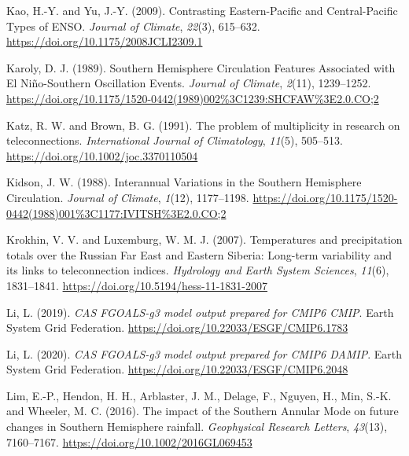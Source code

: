 \documentclass[12pt,oneside,a4paper]{reedthesis}
\newlength{\cslhangindent}
\newenvironment{CSLReferences}[2] %
 {%
  \setlength{\parindent}{0pt}
  \ifodd #1 \everypar{\setlength{\hangindent}{\cslhangindent}}\ignorespaces\fi
  \ifnum #2 > 0
  \setlength{\parskip}{#2\baselineskip}
  \fi
 }%
 {}
\begin{document}
\begin{CSLReferences}{1}{0}
\leavevmode{}%
Kao, H.-Y. and Yu, J.-Y. (2009). Contrasting {Eastern-Pacific} and {Central-Pacific Types} of {ENSO}. \emph{Journal of Climate}, \emph{22}(3), 615--632. \url{https://doi.org/10.1175/2008JCLI2309.1}

\leavevmode{}%
Karoly, D. J. (1989). Southern {Hemisphere Circulation Features Associated} with {El Ni{ñ}o-Southern Oscillation Events}. \emph{Journal of Climate}, \emph{2}(11), 1239--1252. \url{https://doi.org/10.1175/1520-0442(1989)002\%3C1239:SHCFAW\%3E2.0.CO;2}

\leavevmode{}%
Katz, R. W. and Brown, B. G. (1991). The problem of multiplicity in research on teleconnections. \emph{International Journal of Climatology}, \emph{11}(5), 505--513. \url{https://doi.org/10.1002/joc.3370110504}

\leavevmode{}%
Kidson, J. W. (1988). Interannual {Variations} in the {Southern Hemisphere Circulation}. \emph{Journal of Climate}, \emph{1}(12), 1177--1198. \url{https://doi.org/10.1175/1520-0442(1988)001\%3C1177:IVITSH\%3E2.0.CO;2}

\leavevmode{}%
Krokhin, V. V. and Luxemburg, W. M. J. (2007). Temperatures and precipitation totals over the {Russian Far East} and {Eastern Siberia}: Long-term variability and its links to teleconnection indices. \emph{Hydrology and Earth System Sciences}, \emph{11}(6), 1831--1841. \url{https://doi.org/10.5194/hess-11-1831-2007}

\leavevmode{}%
Li, L. (2019). \emph{CAS FGOALS-g3 model output prepared for CMIP6 CMIP}. Earth System Grid Federation. \url{https://doi.org/10.22033/ESGF/CMIP6.1783}

\leavevmode{}%
Li, L. (2020). \emph{CAS FGOALS-g3 model output prepared for CMIP6 DAMIP}. Earth System Grid Federation. \url{https://doi.org/10.22033/ESGF/CMIP6.2048}

\leavevmode{}%
Lim, E.-P., Hendon, H. H., Arblaster, J. M., Delage, F., Nguyen, H., Min, S.-K. and Wheeler, M. C. (2016). The impact of the {Southern Annular Mode} on future changes in {Southern Hemisphere} rainfall. \emph{Geophysical Research Letters}, \emph{43}(13), 7160--7167. \url{https://doi.org/10.1002/2016GL069453}


\end{CSLReferences}
\end{document}
